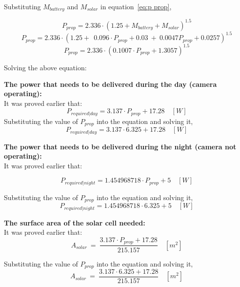\p Substituting $ M_{battery} $ and $ M_{solar} $ in equation~\ref{eq:p prop},

\[
P_{prop} = 2.336 \cdot (1.25 + M_{battery} + M_{solar})^{1.5}
\]
\[
P_{prop} = 2.336 \cdot (1.25 + \ \ 0.096 \cdot P_{prop} + 0.03 \ + \ 0.0047 P_{prop} + 0.0257 )^{1.5}
\]
\[
P_{prop} = 2.336 \cdot ( 0.1007 \cdot P_{prop} + 1.3057 )^{1.5}
\]

Solving the above equation:
\begin{center}
\end{center}

\vspace{1cm}

\p \textbf{The power that needs to be delivered during the day (camera operating):} \vspace{0.1cm}\\
It was proved earlier that:
\[
P_{required|day} = 3.137 \cdot P_{prop} + 17.28 \quad [W]
\]
Substituting the value of $ P_{prop} $ into the equation and solving it,
\[
P_{required|day} = 3.137 \cdot 6.325 + 17.28 \quad [W]
\]
\begin{center}
\end{center}

\vspace{1cm}

\p \textbf{The power that needs to be delivered during the night (camera not operating):} \vspace{0.1cm}\\
It was proved earlier that:

\[
P_{required | night} = 1.454968718 \cdot P_{prop} + 5 \quad [W]
\]

Substituting the value of $ P_{prop} $ into the equation and solving it,
\[
P_{required | night} = 1.454968718 \cdot 6.325 + 5 \quad [W]
\]
\begin{center}
\end{center}

\vspace{1cm}

\p \textbf{The surface area of the solar cell needed:} \vspace{0.1cm}\\
It was proved earlier that:
\[
A_{solar} \ = \ \frac{ 3.137 \cdot P_{prop} + 17.28 }{ 215.157 } \quad [m^2]
\]

Substituting the value of $ P_{prop} $ into the equation and solving it,
\[
A_{solar} \ = \ \frac{ 3.137 \cdot 6.325 + 17.28 }{ 215.157 } \quad [m^2]
\]
\begin{center}
\end{center}

